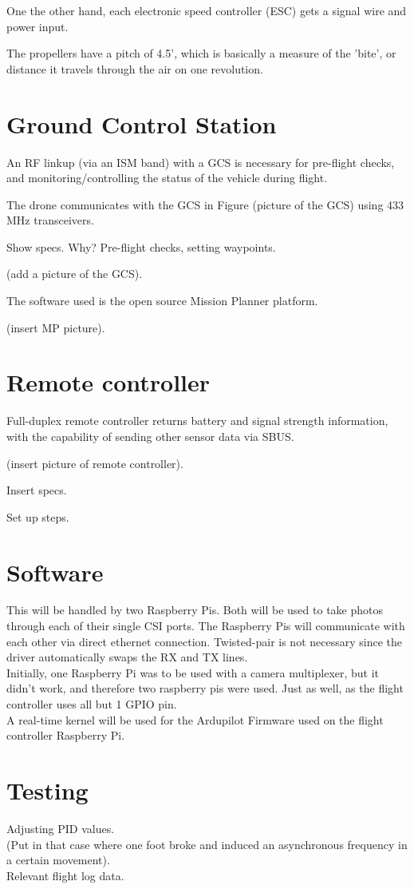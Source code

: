 One the other hand, each electronic speed controller (ESC) gets a signal wire and power input.

The propellers have a pitch of 4.5', which is basically a measure of the 'bite', or distance it travels through the air on one revolution.

\section{Ground Control Station}

An RF linkup (via an ISM band) with a GCS is necessary for pre-flight checks, and monitoring/controlling the status of the vehicle during flight.

The drone communicates with the GCS in Figure (picture of the GCS) using 433 MHz transceivers.

Show specs. Why? Pre-flight checks, setting waypoints.

(add a picture of the GCS).

The software used is the open source Mission Planner platform.

(insert MP picture).

\section{Remote controller}

Full-duplex remote controller returns battery and signal strength information, with the capability of sending other sensor data via SBUS.

(insert picture of remote controller).

Insert specs.

Set up steps.

\section{Software}

This will be handled by two Raspberry Pis. Both will be used to take photos through each of their single CSI ports. The Raspberry Pis will communicate with each other via direct ethernet connection. Twisted-pair is not necessary since the driver automatically swaps the RX and TX lines.\\

Initially, one Raspberry Pi was to be used with a camera multiplexer, but it didn't work, and therefore two raspberry pis were used. Just as well, as the flight controller uses all but 1 GPIO pin.\\

A real-time kernel will be used for the Ardupilot Firmware used on the flight controller Raspberry Pi.\\

\section{Testing}

Adjusting PID values.\\

(Put in that case where one foot broke and induced an asynchronous frequency in a certain movement).\\

Relevant flight log data.